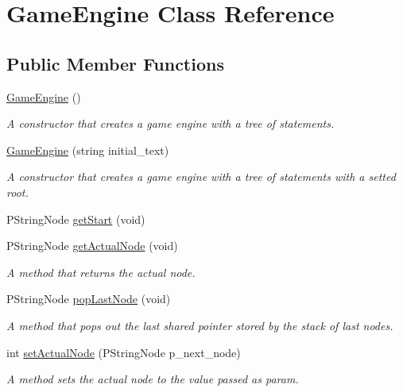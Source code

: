 \hypertarget{classGameEngine}{}\section{Game\+Engine Class Reference}
\label{classGameEngine}
\subsection*{Public Member Functions}
\begin{DoxyCompactItemize}
\item 
\hyperlink{classGameEngine_a64c430f74d72e2745646fdbffbd97930}{Game\+Engine} ()
\begin{DoxyCompactList}\small\item\em A constructor that creates a game engine with a tree of statements. \end{DoxyCompactList}\item 
\hyperlink{classGameEngine_a61a8e7428298785176db2cc23436d4c1}{Game\+Engine} (string initial\+\_\+text)
\begin{DoxyCompactList}\small\item\em A constructor that creates a game engine with a tree of statements with a setted root. \end{DoxyCompactList}\item 
P\+String\+Node \hyperlink{classGameEngine_a921086c9cc040a04b58ab43ca1993b8a}{get\+Start} (void)
\item 
P\+String\+Node \hyperlink{classGameEngine_a12de523ffd3267f652e8834e680bac14}{get\+Actual\+Node} (void)
\begin{DoxyCompactList}\small\item\em A method that returns the actual node. \end{DoxyCompactList}\item 
P\+String\+Node \hyperlink{classGameEngine_acadf06a46e5bd271a7be462bbac559a3}{pop\+Last\+Node} (void)
\begin{DoxyCompactList}\small\item\em A method that pops out the last shared pointer stored by the stack of last nodes. \end{DoxyCompactList}\item 
int \hyperlink{classGameEngine_ae0ea93bfa7e03359bfca6851aac0f79c}{set\+Actual\+Node} (P\+String\+Node p\+\_\+next\+\_\+node)
\begin{DoxyCompactList}\small\item\em A method sets the actual node to the value passed as param. \end{DoxyCompactList}\item 

\end{DoxyCompactItemize}
